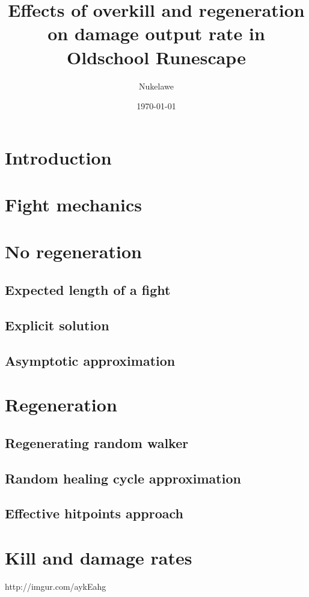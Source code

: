 

\title{Effects of overkill and regeneration on damage output rate in Oldschool Runescape}
\author{Nukelawe}
\date{\today}
\maketitle
\section{Introduction}\label{chap:introduction}


\section{Fight mechanics}\label{chap:fightMechanics}


\section{No regeneration}\label{chap:noregen}

\subsection{Expected length of a fight}\label{chap:noregenRecurrences}

\subsection{Explicit solution}\label{chap:noregenSolution}

\subsection{Asymptotic approximation}\label{chap:noregenAsymptotics}


\pagebreak
\section{Regeneration}\label{chap:regen}

\subsection{Regenerating random walker}\label{chap:regen-walker}

\subsection{Random healing cycle approximation}

\subsection{Effective hitpoints approach}


\section{Kill and damage rates}


\begin{thebibliography}{9}
	http://imgur.com/aykEahg

\end{thebibliography}

%


